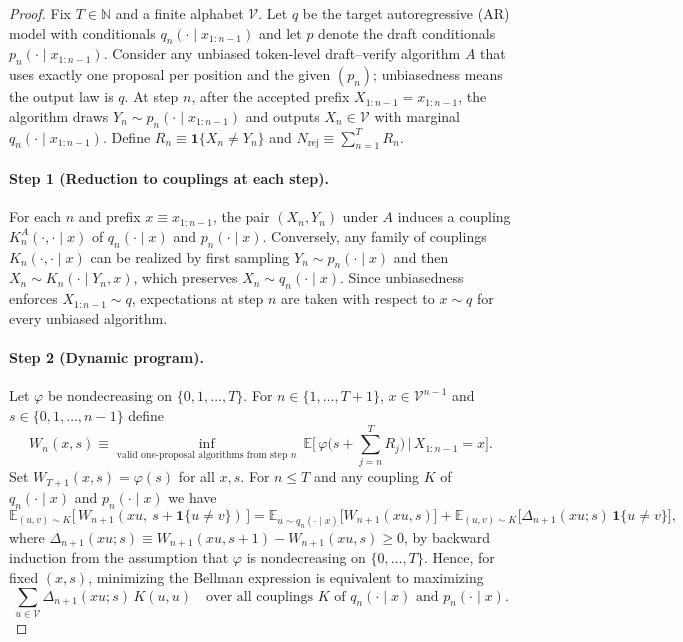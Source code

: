 \begin{proof}
Fix $T\in\mathbb N$ and a finite alphabet $\mathcal V$. Let $q$ be the target autoregressive (AR) model with conditionals $q_n(\cdot\mid x_{1:n-1})$ and let $p$ denote the draft conditionals $p_n(\cdot\mid x_{1:n-1})$. Consider any unbiased token-level draft--verify algorithm $A$ that uses exactly one proposal per position and the given $(p_n)$; unbiasedness means the output law is $q$. At step $n$, after the accepted prefix $X_{1:n-1}=x_{1:n-1}$, the algorithm draws $Y_n\sim p_n(\cdot\mid x_{1:n-1})$ and outputs $X_n\in\mathcal V$ with marginal $q_n(\cdot\mid x_{1:n-1})$. Define $R_n\equiv\mathbf 1\{X_n\ne Y_n\}$ and $N_{\mathrm{rej}}\equiv\sum_{n=1}^T R_n$.

\paragraph{Step 1 (Reduction to couplings at each step).}
For each $n$ and prefix $x\equiv x_{1:n-1}$, the pair $(X_n,Y_n)$ under $A$ induces a coupling $K_n^A(\cdot,\cdot\mid x)$ of $q_n(\cdot\mid x)$ and $p_n(\cdot\mid x)$. Conversely, any family of couplings $K_n(\cdot,\cdot\mid x)$ can be realized by first sampling $Y_n\sim p_n(\cdot\mid x)$ and then $X_n\sim K_n(\cdot\mid Y_n,x)$, which preserves $X_n\sim q_n(\cdot\mid x)$. Since unbiasedness enforces $X_{1:n-1}\sim q$, expectations at step $n$ are taken with respect to $x\sim q$ for every unbiased algorithm.

\paragraph{Step 2 (Dynamic program).}
Let $\varphi$ be nondecreasing on $\{0,1,\dots,T\}$. For $n\in\{1,\dots,T+1\}$, $x\in\mathcal V^{n-1}$ and $s\in\{0,1,\dots,n-1\}$ define
\[
W_n(x,s)\equiv\inf_{\text{valid one-proposal algorithms from step }n}\ \mathbb E\big[\,\varphi\big(s+\textstyle\sum_{j=n}^T R_j\big)\,\big|\,X_{1:n-1}=x\big].
\]
Set $W_{T+1}(x,s)=\varphi(s)$ for all $x,s$. For $n\le T$ and any coupling $K$ of $q_n(\cdot\mid x)$ and $p_n(\cdot\mid x)$ we have
\[
\mathbb E_{(u,v)\sim K}\big[\,W_{n+1}(xu,\ s+\mathbf 1\{u\ne v\})\,\big]
= \mathbb E_{u\sim q_n(\cdot\mid x)}\big[W_{n+1}(xu,s)\big]
+ \mathbb E_{(u,v)\sim K}\big[\Delta_{n+1}(xu;s)\,\mathbf 1\{u\ne v\}\big],
\]
where $\Delta_{n+1}(xu;s)\equiv W_{n+1}(xu,s+1)-W_{n+1}(xu,s)\ge 0$, by backward induction from the assumption that $\varphi$ is nondecreasing on $\{0,\dots,T\}$. Hence, for fixed $(x,s)$, minimizing the Bellman expression is equivalent to maximizing
\[
\sum_{u\in\mathcal V} \Delta_{n+1}(xu;s)\, K(u,u)\quad\text{over all couplings $K$ of $q_n(\cdot\mid x)$ and $p_n(\cdot\mid x)$}.
\]


\end{proof}
